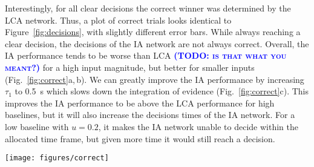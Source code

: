 \documentclass[10pt,letterpaper]{article}
\makeatletter
\newcommand{\todo}[1]{\textbf{\textsc{\textcolor{blue}{(TODO\@: #1)}}}}
\makeatother
\begin{document}
Interestingly, for all clear decisions the correct winner was determined by the LCA network.
Thus, a plot of correct trials looks identical to Figure~\ref{fig:decisions}, with slightly different error bars.
While always reaching a clear decision, the decisions of the IA network are not always correct.
Overall, the IA performance tends to be worse than LCA \todo{is that what you meant?} for a high input magnitude, but better for smaller inputs (Fig.~\ref{fig:correct}a,\,b).
We can greatly improve the IA performance by increasing $\tau_1$ to \SI{0.5}{\second} which slows down the integration of evidence (Fig.~\ref{fig:correct}c).
This improves the IA performance to be above the LCA performance for high baselines, but it will also increase the decisions times of the IA network.
For a low baseline with $u=0.2$, it makes the IA network unable to decide within the allocated time frame, but given more time it would still reach a decision.
\begin{figure*}[t]
    \centering
    \texttt{[image: figures/correct]}
    \caption{
        Fraction of correct trials for the IA network.
        Each plot shows data for a different combination of input magnitude $u$ and integration time constant $\tau_1$.
        Error bars denote bootstrapped 95\% confidence intervals.
        The grey horizontal line indicates the optimum.
    }\label{fig:correct}
\end{figure*}
\end{document}
